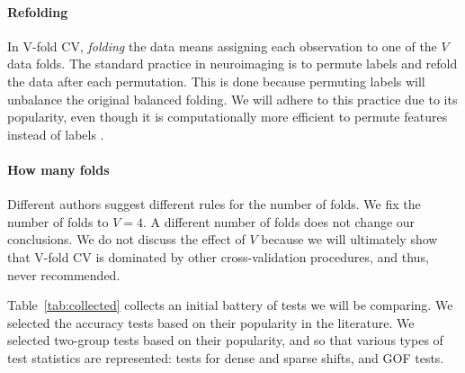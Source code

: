 \documentclass[]{bio}
\begin{document}
\paragraph{Refolding}
In V-fold CV, \emph{folding} the data means assigning each observation to one of the $V$ data folds. 
The standard practice in neuroimaging is to permute labels and refold the data after each permutation. 
This is done because permuting labels will unbalance the original balanced folding.
We will adhere to this practice due to its popularity, even though it is computationally more efficient to permute features instead of labels \citep[e.g.][]{golland_permutation_2005} .


\paragraph{How many folds}
Different authors suggest different rules for the number of folds. 
We fix the number of folds to $V=4$.
A different number of folds does not change our conclusions. 
We do not discuss the effect of $V$ because we will ultimately show that V-fold CV is dominated by other cross-validation procedures, and thus, never recommended. 

\bigskip

Table~\ref{tab:collected} collects an initial battery of tests we will be comparing. 
We selected the accuracy tests based on their popularity in the literature.
We selected two-group tests based on their popularity, and so that various types of test statistics are represented: tests for dense and sparse shifts, and GOF tests. 
\end{document}
